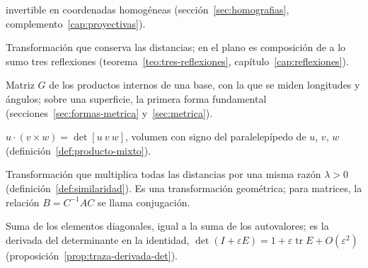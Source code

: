 \begin{description}[style=nextline,leftmargin=1.2em,itemsep=2pt]
invertible en coordenadas homogéneas (sección~\ref{sec:homografias},
complemento~\ref{cap:proyectivas}).
\item[Isometría] Transformación que conserva las distancias; en el plano es composición de a
lo sumo tres reflexiones (teorema~\ref{teo:tres-reflexiones}, capítulo~\ref{cap:reflexiones}).
\item[Métrica] Matriz \(G\) de los productos internos de una base, con la que se miden
longitudes y ángulos; sobre una superficie, la primera forma fundamental
(secciones~\ref{sec:formas-metrica} y~\ref{sec:metrica}).
\item[Producto mixto] \(u\cdot(v\times w)=\det[u\ v\ w]\), volumen con signo del
paralelepípedo de \(u\), \(v\), \(w\) (definición~\ref{def:producto-mixto}).
\item[Similaridad] Transformación que multiplica todas las distancias por una misma razón
\(\lambda>0\) (definición~\ref{def:similaridad}). Es una transformación geométrica; para
matrices, la relación \(B=C^{-1}AC\) se llama conjugación.
\item[Traza] Suma de los elementos diagonales, igual a la suma de los autovalores; es la
derivada del determinante en la identidad, \(\det(I+\varepsilon E)=1+\varepsilon\operatorname{tr}E+O(\varepsilon^2)\)
(proposición~\ref{prop:traza-derivada-det}).
\end{description}
